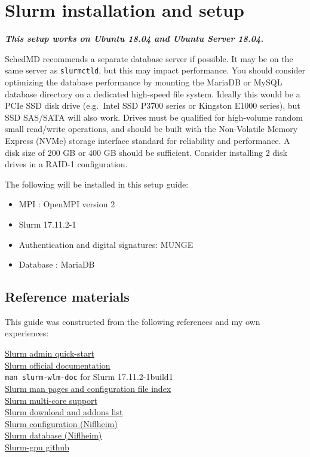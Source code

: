 \chapter{Slurm installation and setup} \label{ch:slurmsetup}

\textbf{\emph{This setup works on Ubuntu 18.04 and Ubuntu Server 18.04.}}

SchedMD recommends a separate database server if possible. It may be on the same server as \texttt{slurmctld}, but this may impact performance. You should consider optimizing the database performance by mounting the MariaDB or MySQL database directory on a dedicated high-speed file system. Ideally this would be a PCIe SSD disk drive (e.g.\ Intel SSD P3700 series or Kingston E1000 series), but SSD SAS/SATA will also work. Drives must be qualified for high-volume random small read/write operations, and should be built with the Non-Volatile Memory Express (NVMe) storage interface standard for reliability and performance. A disk size of 200 GB or 400 GB should be sufficient. Consider installing 2 disk drives in a RAID-1 configuration.

The following will be installed in this setup guide:

\begin{itemize}
\item MPI : OpenMPI version 2
\item Slurm 17.11.2-1
\item Authentication and digital signatures: MUNGE
\item Database : MariaDB
\end{itemize}

\section{Reference materials} \label{sec:slurmguides}

This guide was constructed from the following references and my own experiences:

\href{https://slurm.schedmd.com/quickstart_admin.html}{Slurm admin quick-start} \\
\indent \href{https://slurm.schedmd.com/documentation.html}{Slurm official documentation} \\
\indent \texttt{man slurm-wlm-doc} for Slurm 17.11.2-1build1 \\
\indent \href{https://slurm.schedmd.com/man_index.html}{Slurm man pages and configuration file index} \\
\indent \href{https://slurm.schedmd.com/mc_support.html}{Slurm multi-core support} \\
\indent \href{https://slurm.schedmd.com/download.html}{Slurm download and addons list} \\
\indent \href{https://wiki.fysik.dtu.dk/niflheim/Slurm_configuration}{Slurm configuration (Niflheim)} \\
\indent \href{https://wiki.fysik.dtu.dk/niflheim/Slurm_database}{Slurm database (Niflheim)} \\
\indent \href{https://github.com/dholt/slurm-gpu}{Slurm-gpu github}

